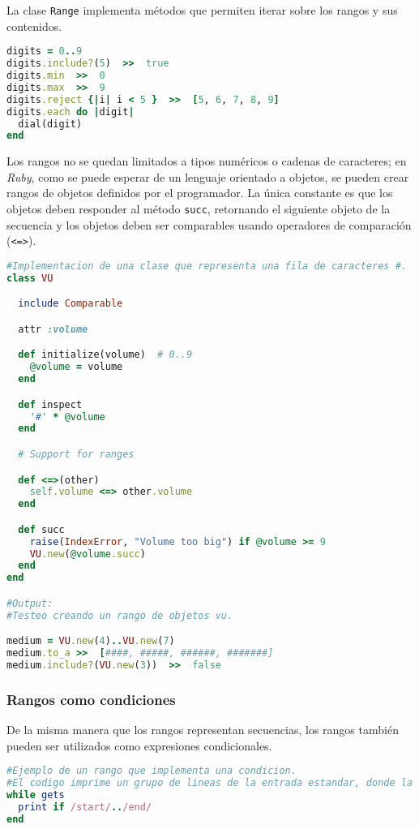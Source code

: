 La clase \texttt{Range} implementa métodos que permiten iterar sobre los rangos y sus contenidos.

\begin{lstlisting}[language=Ruby]
digits = 0..9
digits.include?(5)	>>	true
digits.min	>>	0
digits.max	>>	9
digits.reject {|i| i < 5 }	>>	[5, 6, 7, 8, 9]
digits.each do |digit|
  dial(digit)
end
\end{lstlisting}

Los rangos no se quedan limitados a tipos numéricos o cadenas de caracteres; en \textit{Ruby}, como se puede esperar de un lenguaje orientado a objetos, se pueden crear rangos de objetos definidos por el programador. La única constante es que los objetos deben responder al método \texttt{succ}, retornando el siguiente objeto de la secuencia y los objetos deben ser comparables usando operadores de comparación (\texttt{<=>}).

\begin{lstlisting}[language=Ruby]
#Implementacion de una clase que representa una fila de caracteres #.
class VU

  include Comparable

  attr :volume

  def initialize(volume)  # 0..9
    @volume = volume
  end

  def inspect
    '#' * @volume
  end

  # Support for ranges

  def <=>(other)
    self.volume <=> other.volume
  end

  def succ
    raise(IndexError, "Volume too big") if @volume >= 9
    VU.new(@volume.succ)
  end
end

#Output:
#Testeo creando un rango de objetos vu.

medium = VU.new(4)..VU.new(7)
medium.to_a	>>	[####, #####, ######, #######]
medium.include?(VU.new(3))	>>	false
\end{lstlisting}

\subsubsection{Rangos como condiciones}
De la misma manera que los rangos representan secuencias, los rangos también pueden ser utilizados como expresiones condicionales. 

\begin{lstlisting}[language=Ruby]
#Ejemplo de un rango que implementa una condicion.
#El codigo imprime un grupo de lineas de la entrada estandar, donde la primera linea de cada grupo que contiene la parabra "start" y en la que la ultima linea contenga la palabra "end".
while gets
  print if /start/../end/
end
\end{lstlisting}

